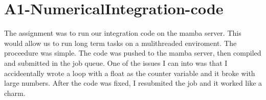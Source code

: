 \documentclass{article}
\begin{document}
	\section{A1-NumericalIntegration-code}
	The assignment was to run our integration code on the mamba server. This would allow us to run long term tasks on a mulithreaded enviroment. The proceedure was simple. The code was pushed to the mamba server, then compiled and submitted in the job queue. One of the issues I can into was that I accideentally wrote a loop with a float as the counter variable and it broke with large numbers. After the code was fixed, I resubmited the job and it worked like a charm.
\end{document}
